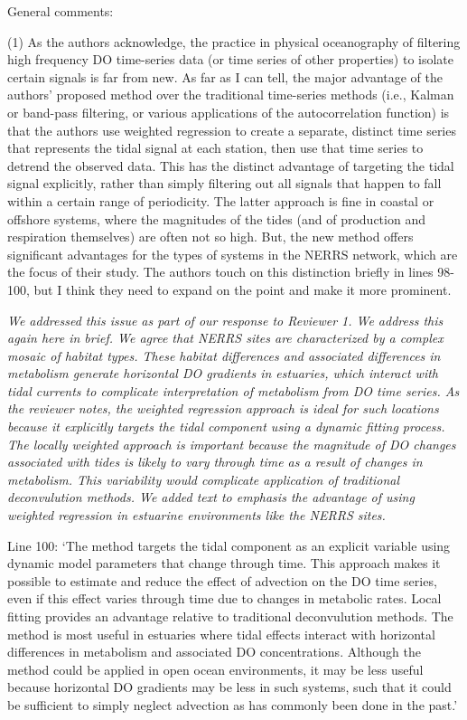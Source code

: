 \documentclass[letterpaper,12pt]{article}\usepackage[]{graphicx}\usepackage[]{color}
\begin{document}
General comments:

(1) As the authors acknowledge, the practice in physical oceanography of filtering high frequency DO time-series data (or time series of other properties) to isolate certain signals is far from new. As far as I can tell, the major advantage of the authors’ proposed method over the traditional time-series methods (i.e., Kalman or band-pass filtering, or various applications of the autocorrelation function) is that the authors use weighted regression to create a separate, distinct time series that represents the tidal signal at each station, then use that time series to detrend the observed data. This has the distinct advantage of targeting the tidal signal explicitly, rather than simply filtering out all signals that happen to fall within a certain range of periodicity. The latter approach is fine in coastal or offshore systems, where the magnitudes of the tides (and of production and respiration themselves) are often not so high. But, the new method offers significant advantages for the types of systems in the NERRS network, which are the focus of their study. The authors touch on this distinction briefly in lines 98-100, but I think they need to expand on the point and make it more prominent.

{\it We addressed this issue as part of our response to Reviewer 1.  We address this again here in brief.  We agree that NERRS sites are characterized by a complex mosaic of habitat types.  These habitat differences and associated differences in metabolism generate horizontal DO gradients in estuaries, which interact with tidal currents to complicate interpretation of metabolism from DO time series.  As the reviewer notes, the weighted regression approach is ideal for such locations because it explicitly targets the tidal component using a dynamic fitting process. The locally weighted approach is important because the magnitude of DO changes associated with tides is likely to vary through time as a result of changes in metabolism.  This variability would complicate application of traditional deconvulution methods.  We added text to emphasis the advantage of using weighted regression in estuarine environments like the NERRS sites.

Line 100: `The method targets the tidal component as an explicit variable using dynamic model parameters that change through time.  This approach makes it possible to estimate and reduce the effect of advection on the DO time series, even if this effect varies through time due to changes in metabolic rates.  Local fitting provides an advantage relative to traditional deconvulution methods. The method is most useful in estuaries where tidal effects interact with horizontal differences in metabolism and associated DO concentrations.  Although the method could be applied in open ocean environments, it may be less useful because horizontal DO gradients may be less in such systems, such that it could be sufficient to simply neglect advection as has commonly been done in the past.'
}
\end{document}
